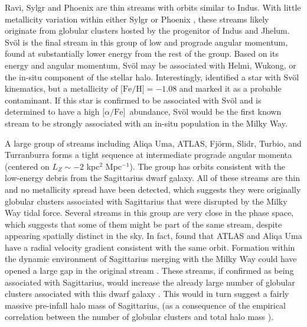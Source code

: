 \documentclass[twocolumn]{aastex63}
\newcommand{\feh}{\ensuremath{\textrm{[Fe/H]}}}
\newcommand{\afe}{\ensuremath{\textrm{[$\alpha$/Fe]}}}
\begin{document}
Ravi, Sylgr and Phoenix are thin streams with orbits similar to Indus.
With little metallicity variation within either Sylgr or Phoenix \citep{ibata2019, wan2020}, these streams likely originate from globular clusters hosted by the progenitor of Indus and Jhelum.
Sv\" ol is the final stream in this group of low and prograde angular momentum, found at substantially lower energy from the rest of the group.
Based on its energy and angular momentum, Sv\" ol may be associated with Helmi, Wukong, or the in-situ component of the stellar halo.
Interestingly, \citet{ibata2019} identified a star with Sv\" ol kinematics, but a metallicity of $\feh=-1.08$ and marked it as a probable contaminant.
If this star is confirmed to be associated with Sv\" ol and is determined to have a high \afe\ abundance, Sv\" ol would be the first known stream to be strongly associated with an in-situ population in the Milky Way. 

A large group of streams including Aliqa Uma, ATLAS, Fj\" orm, Slidr, Turbio, and Turranburra forms a tight sequence at intermediate prograde angular momenta (centered on $L_Z\sim-2$ kpc$^2$ Mpc$^{-1}$).
The group has orbits consistent with the low-energy debris from the Sagittarius dwarf galaxy.
All of these streams are thin and no metallicity spread have been detected, which suggests they were originally globular clusters associated with Sagittarius that were disrupted by the Milky Way tidal force.
Several streams in this group are very close in the phase space, which suggests that some of them might be part of the same stream, despite appearing spatially distinct in the sky.
In fact, \citet{li2020} found that ATLAS and Aliqa Uma have a radial velocity gradient consistent with the same orbit.
Formation within the dynamic environment of Sagittarius merging with the Milky Way could have opened a large gap in the original stream \citep{bonaca2020b, deboer2020}.
These streams, if confirmed as being associated with Sagittarius, would increase the already large number of globular clusters associated with this dwarf galaxy \citep[$5-7$; see][]{Johnson2020}.  
This would in turn suggest a fairly massive pre-infall halo mass of Sagittarius,  (as a consequence of the empirical correlation between the number of globular clusters and total halo mass \cite{Harris, Burkert, etc.}).
\end{document}
